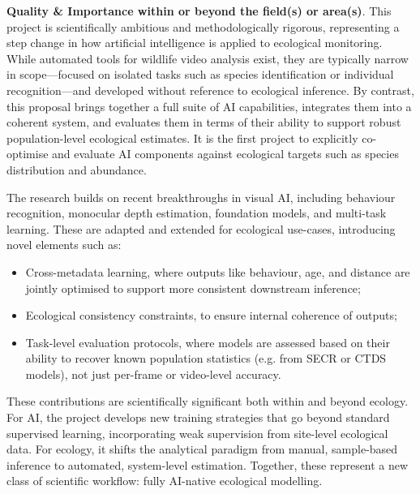 
\textbf{Quality \& Importance within or beyond the field(s) or area(s)}. This project is scientifically ambitious and methodologically rigorous, representing a step change in how artificial intelligence is applied to ecological monitoring. While automated tools for wildlife video analysis exist, they are typically narrow in scope—focused on isolated tasks such as species identification or individual recognition—and developed without reference to ecological inference. By contrast, this proposal brings together a full suite of AI capabilities, integrates them into a coherent system, and evaluates them in terms of their ability to support robust population-level ecological estimates. It is the first project to explicitly co-optimise and evaluate AI components against ecological targets such as species distribution and abundance.

The research builds on recent breakthroughs in visual AI, including behaviour recognition, monocular depth estimation, foundation models, and multi-task learning. These are adapted and extended for ecological use-cases, introducing novel elements such as:

\begin{itemize}
    \item Cross-metadata learning, where outputs like behaviour, age, and distance are jointly optimised to support more consistent downstream inference;
    \item Ecological consistency constraints, to ensure internal coherence of outputs;
    \item Task-level evaluation protocols, where models are assessed based on their ability to recover known population statistics (e.g. from SECR or CTDS models), not just per-frame or video-level accuracy.
\end{itemize}

These contributions are scientifically significant both within and beyond ecology. For AI, the project develops new training strategies that go beyond standard supervised learning, incorporating weak supervision from site-level ecological data. For ecology, it shifts the analytical paradigm from manual, sample-based inference to automated, system-level estimation. Together, these represent a new class of scientific workflow: fully AI-native ecological modelling.

